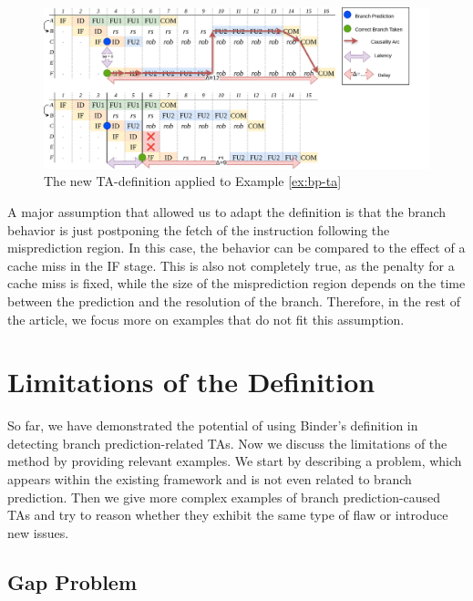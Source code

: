 \begin{figure}
    \centering
    \includegraphics[width=\textwidth]{figures/simple-branch-ta-analyzed.png}
    \caption{The new TA-definition applied to Example \ref{ex:bp-ta}}
    \label{fig:bp-ta-analyzed}
\end{figure}

A major assumption that allowed us to adapt the definition is that the branch behavior is just postponing the fetch of the instruction following the misprediction region. In this case, the behavior can be compared to the effect of a cache miss in the IF stage. This is also not completely true, as the penalty for a cache miss is fixed, while the size of the misprediction region depends on the time between the prediction and the resolution of the branch. Therefore, in the rest of the article, we focus more on examples that do not fit this assumption.





\section{Limitations of the Definition}

So far, we have demonstrated the potential of using Binder's definition in detecting branch prediction-related TAs. Now we discuss the limitations of the method by providing relevant examples. We start by describing a problem, which appears within the existing framework and is not even related to branch prediction. Then we give more complex examples of branch prediction-caused TAs and try to reason whether they exhibit the same type of flaw or introduce new issues.

\subsection{Gap Problem}

